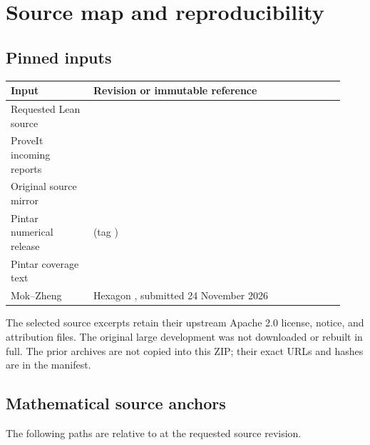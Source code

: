 \section{Source map and reproducibility}

\subsection{Pinned inputs}

\begin{longtable}{@{}P{0.23\linewidth}P{0.70\linewidth}@{}}
\toprule
Input & Revision or immutable reference\\
\midrule
\endhead
Requested Lean source &
\\[4pt]
ProveIt incoming reports &
\\[4pt]
Original source mirror &
\\[4pt]
Pintar numerical release &
 (tag )\\[4pt]
Pintar coverage text &
\\[4pt]
Mok--Zheng &
Hexagon , submitted 24 November 2026\\
\bottomrule
\end{longtable}

The selected source excerpts retain their upstream Apache 2.0 license,
notice, and attribution files. The original large development was
not downloaded or rebuilt in full. The prior archives are not copied
into this ZIP; their exact URLs and hashes are in the manifest.

\subsection{Mathematical source anchors}

The following paths are relative to  at the requested
source revision.


